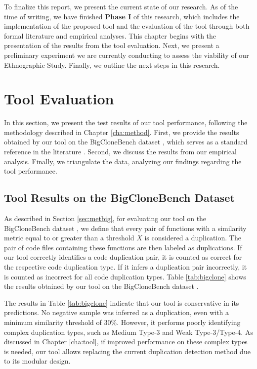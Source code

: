 \en 

To finalize this report, we present the current state of our research. As of the 
time of writing, we have finished \textbf{Phase I} of this research, 
which includes the implementation of 
the proposed tool and the evaluation of the tool through both formal literature 
and empirical analyses. This chapter begins with the presentation of the results 
from the tool evaluation. Next, we present a preliminary experiment we are currently 
conducting to assess the viability of our Ethnographic Study. Finally, we outline 
the next steps in this research.

\section{Tool Evaluation}
\label{sec:eval}

In this section, we present the test results of our tool performance, following the methodology described in Chapter \ref{cha:method}. First, we provide the results obtained by our tool on the BigCloneBench dataset \citep{bigclonebench}, which serves as a standard reference in the literature \citep{litreview}. Second, we discuss the results from our empirical analysis. Finally, we triangulate the data, analyzing our findings regarding the tool performance.

\subsection{Tool Results on the BigCloneBench Dataset}



As described in Section \ref{sec:metbig}, for evaluating our tool on the BigCloneBench dataset \citep{bigclonebench}, we define that every pair of functions with a similarity metric equal to or greater than a threshold \( X \) is considered a duplication. The pair of code files containing these functions are then labeled as duplications. If our tool correctly identifies a code duplication pair, it is counted as correct for the respective code duplication type. If it infers a duplication pair incorrectly, it is counted as incorrect for all code duplication types. Table \ref{tab:bigclone} shows the results obtained by our tool on the BigCloneBench dataset \citep{bigclonebench}.

The results in Table \ref{tab:bigclone} indicate that our tool is conservative in its predictions. No negative sample was inferred as a duplication, even with a minimum similarity threshold of 30\%. However, it performs poorly identifying complex duplication types, such as Medium Type-3 and Weak Type-3/Type-4. As discussed in Chapter \ref{cha:tool}, if improved performance on these complex types is needed, our tool allows replacing the current duplication detection method due to its modular design.

